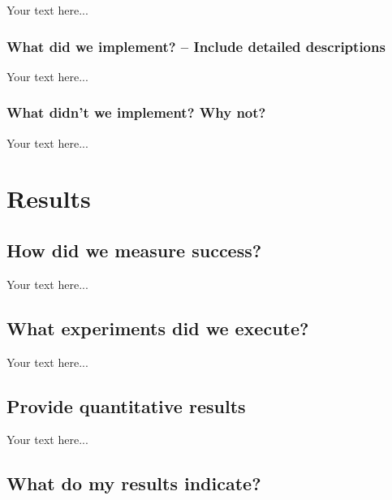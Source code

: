 \documentclass[accepted,single]{gipaper}
\begin{document}
Your text here...

\subsubsection{What did we implement? -- Include detailed descriptions}

Your text here...

\subsubsection{What didn't we implement? Why not?}

Your text here...


\section{Results}

\subsection{How did we measure success?}

Your text here...

\subsection{What experiments did we execute?}

Your text here...

\subsection{Provide quantitative results}

Your text here...

\subsection{What do my results indicate?}
\end{document}
